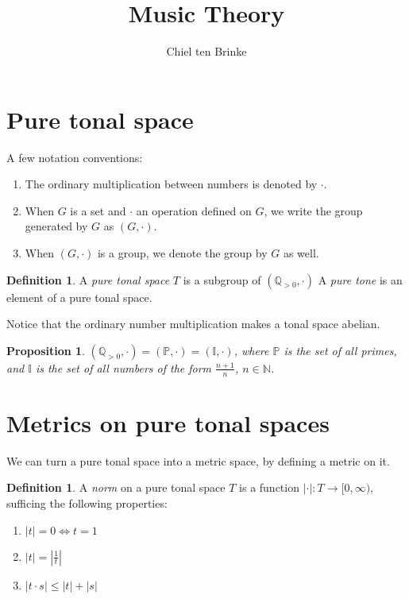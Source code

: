 \documentclass[a4paper]{article}
\title{Music Theory}
\author{Chiel ten Brinke}
\newtheorem{proposition}[theorem]{Proposition}
\theoremstyle{definition}
\newtheorem{definition}[theorem]{Definition}
\begin{document}
\maketitle

\newcommand{\Q}{\mathbb{Q}_{> 0}}
\newcommand{\R}{\mathbb{R}_{> 0}}
\newcommand{\Primes}{\mathbb{P}}
\newcommand{\I}{\mathbb{I}}

\section{Pure tonal space}

A few notation conventions:
\begin{enumerate}[i]
	\item 
		The ordinary multiplication between numbers is denoted by $\cdot$.
	\item 
		When $G$ is a set and $\cdot$ an operation defined on $G$, we write the group generated by $G$ as $(G, \cdot)$.
	\item 
		When $(G, \cdot)$ is a group, we denote the group by $G$ as well.
\end{enumerate}


\begin{definition}
	A \emph{pure tonal space} $T$ is a subgroup of $(\Q, \cdot)$
	A \emph{pure tone} is an element of a pure tonal space.
\end{definition}

Notice that the ordinary number multiplication makes a tonal space abelian.

\begin{proposition}
	$(\Q, \cdot) = (\Primes,\cdot) = (\I,\cdot)$, where $\Primes$ is the set of all primes, and $\I$ is the set of all numbers of the form $\frac{n+1}{n}$, $n \in \mathbb{N}$.
\end{proposition}

\section{Metrics on pure tonal spaces}
We can turn a pure tonal space into a metric space, by defining a metric on it.

\begin{definition}
	A \emph{norm} on a pure tonal space $T$ is a function $|\cdot|:T \to [0,\infty)$, sufficing the following properties:
	\begin{enumerate}[i]
		\item $|t| = 0 \Leftrightarrow t=1$
		\item $|t| = |\frac{1}{t}|$
		\item $|t \cdot s| \leq |t| + |s|$
	\end{enumerate}
\end{definition}
\end{document}
